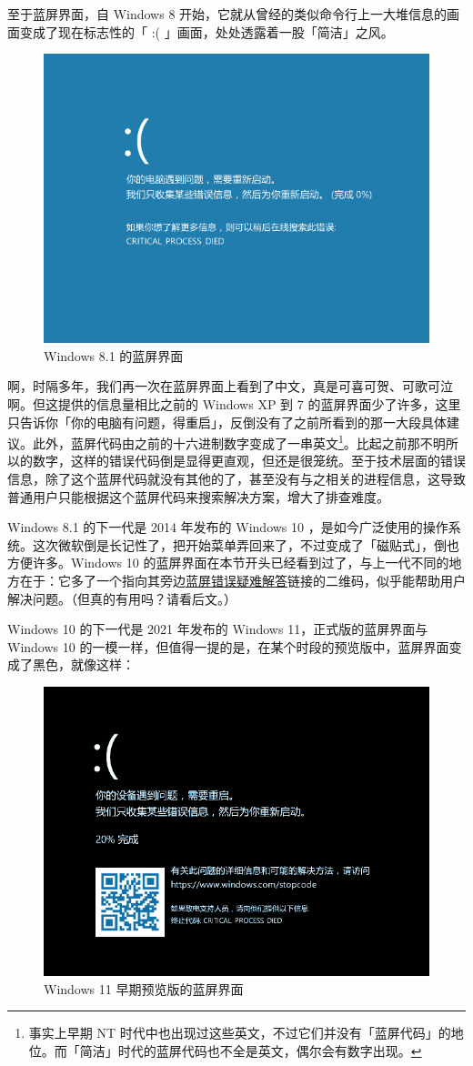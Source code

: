 至于蓝屏界面，自 Windows 8 开始，它就从曾经的类似命令行上一大堆信息的画面变成了现在标志性的「 :( 」画面，处处透露着一股「简洁」之风。

\begin{figure}[htb!]
  \centering
  \includegraphics[width=.6\textwidth]{assets/advanced/Win-8.1-BSoD.png}
  \caption{Windows 8.1 的蓝屏界面}
  \label{fig:Win-8.1-BSoD}
\end{figure}

啊，时隔多年，我们再一次在蓝屏界面上看到了中文，真是可喜可贺、可歌可泣啊。但这提供的信息量相比之前的 Windows XP 到 7 的蓝屏界面少了许多，这里只告诉你「你的电脑有问题，得重启」，反倒没有了之前所看到的那一大段具体建议。此外，蓝屏代码由之前的十六进制数字变成了一串英文\footnote{事实上早期 NT 时代中也出现过这些英文，不过它们并没有「蓝屏代码」的地位。而「简洁」时代的蓝屏代码也不全是英文，偶尔会有数字出现。}。比起之前那不明所以的数字，这样的错误代码倒是显得更直观，但还是很笼统。至于技术层面的错误信息，除了这个蓝屏代码就没有其他的了，甚至没有与之相关的进程信息，这导致普通用户只能根据这个蓝屏代码来搜索解决方案，增大了排查难度。

Windows 8.1 的下一代是 2014 年发布的 Windows 10 ，是如今广泛使用的操作系统。这次微软倒是长记性了，把开始菜单弄回来了，不过变成了「磁贴式」，倒也方便许多。Windows 10 的蓝屏界面在本节开头已经看到过了，与上一代不同的地方在于：它多了一个指向其旁边\href{https://www.windows.com/stopcode}{蓝屏错误疑难解答}链接的二维码，似乎能帮助用户解决问题。（但真的有用吗？请看后文。）

Windows 10 的下一代是 2021 年发布的 Windows 11，正式版的蓝屏界面与 Windows 10 的一模一样，但值得一提的是，在某个时段的预览版中，蓝屏界面变成了黑色，就像这样：

\begin{figure}[htb!]
  \centering
  \includegraphics[width=.6\textwidth]{assets/advanced/Win-11-Pre-BSoD.png}
  \caption{Windows 11 早期预览版的蓝屏界面}
  \label{fig:Win-11-Pre-BSoD}
\end{figure}

